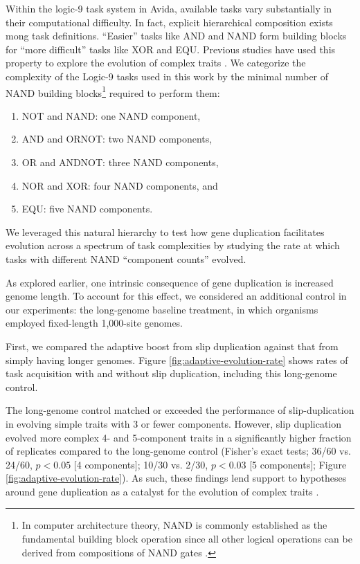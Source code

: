 Within the logic-9 task system in Avida, available tasks vary substantially in their computational difficulty.
In fact, explicit hierarchical composition exists mong task definitions.
``Easier'' tasks like AND and NAND form building blocks for ``more difficult'' tasks like XOR and EQU.
Previous studies have used this property to explore the evolution of complex traits \citep{lenski2003evolution}.
We categorize the complexity of the Logic-9 tasks used in this work by the minimal number of NAND building blocks\footnote{
In computer architecture theory, NAND is commonly established as the fundamental building block operation since all other logical operations can be derived from compositions of NAND gates \citep{mano1997logic}.
} required to perform them:
\begin{enumerate}
\item NOT and NAND: one NAND component,
\item AND and ORNOT: two NAND components,
\item OR and ANDNOT: three NAND components,
\item NOR and XOR: four NAND components, and
\item EQU: five NAND components.
\end{enumerate}
We leveraged this natural hierarchy to test how gene duplication facilitates evolution across a spectrum of task complexities by studying the rate at which tasks with different NAND ``component counts'' evolved.

As explored earlier, one intrinsic consequence of gene duplication is increased genome length.
To account for this effect, we considered an additional control in our experiments: the long-genome baseline treatment, in which organisms employed fixed-length 1,000-site genomes.



First, we compared the adaptive boost from slip duplication against that from simply having longer genomes.
Figure \ref{fig:adaptive-evolution-rate} shows rates of task acquisition with and without slip duplication, including this long-genome control.

The long-genome control matched or exceeded the performance of slip-duplication in evolving simple traits with 3 or fewer components.
However, slip duplication evolved more complex 4- and 5-component traits in a significantly higher fraction of replicates compared to the long-genome control (Fisher's exact tests; 36/60 vs. 24/60, $p<0.05$ [4 components]; 10/30 vs. 2/30, $p<0.03$ [5 components]; Figure \ref{fig:adaptive-evolution-rate}).
As such, these findings lend support to hypotheses around gene duplication as a catalyst for the evolution of complex traits \citep{ohno1970evolution}.

